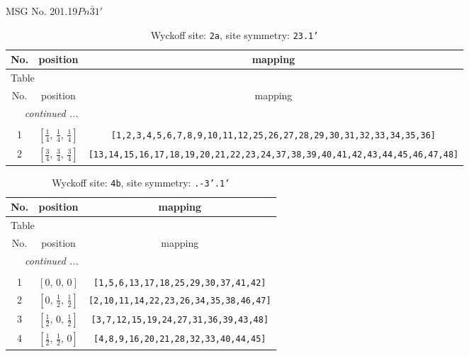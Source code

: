 \documentclass[fleqn,8pt]{jsarticle}
\begin{document}
\setcounter{MaxMatrixCols}{32}

\renewcommand{\tablename}{Table~}
\renewcommand{\figurename}{Figure~}
\begin{center}
\LARGE
MSG No. 201.19\quad$Pn\bar{3}1'$
\end{center}
\renewcommand{\arraystretch}{1.2}
\begin{longtable}{ccc}
\caption{Wyckoff site: {\tt 2a}, site symmetry: {\tt 23.1'}}
 \\
 \hline \hline
No. & position & mapping \\ \hline \endfirsthead

\multicolumn{2}{l}{\tablename\ \thetable{}} \\
 \hline \hline
No. & position & mapping \\ \hline \endhead

 \hline \hline
\multicolumn{2}{r}{\footnotesize\it continued ...} \\ \endfoot

 \hline \hline
\multicolumn{2}{r}{} \\ \endlastfoot

1 & $\left[ \frac{1}{4},\, \frac{1}{4},\, \frac{1}{4} \right]$ & {\tt [1,2,3,4,5,6,7,8,9,10,11,12,25,26,27,28,29,30,31,32,33,34,35,36]} \\ \hline
2 & $\left[ \frac{3}{4},\, \frac{3}{4},\, \frac{3}{4} \right]$ & {\tt [13,14,15,16,17,18,19,20,21,22,23,24,37,38,39,40,41,42,43,44,45,46,47,48]} \\
\end{longtable}
\renewcommand{\arraystretch}{1.2}
\begin{longtable}{ccc}
\caption{Wyckoff site: {\tt 4b}, site symmetry: {\tt .-3'.1'}}
 \\
 \hline \hline
No. & position & mapping \\ \hline \endfirsthead

\multicolumn{2}{l}{\tablename\ \thetable{}} \\
 \hline \hline
No. & position & mapping \\ \hline \endhead

 \hline \hline
\multicolumn{2}{r}{\footnotesize\it continued ...} \\ \endfoot

 \hline \hline
\multicolumn{2}{r}{} \\ \endlastfoot

1 & $\left[ 0,\, 0,\, 0 \right]$ & {\tt [1,5,6,13,17,18,25,29,30,37,41,42]} \\ \hline
2 & $\left[ 0,\, \frac{1}{2},\, \frac{1}{2} \right]$ & {\tt [2,10,11,14,22,23,26,34,35,38,46,47]} \\ \hline
3 & $\left[ \frac{1}{2},\, 0,\, \frac{1}{2} \right]$ & {\tt [3,7,12,15,19,24,27,31,36,39,43,48]} \\ \hline
4 & $\left[ \frac{1}{2},\, \frac{1}{2},\, 0 \right]$ & {\tt [4,8,9,16,20,21,28,32,33,40,44,45]} \\
\end{longtable}
\end{document}
